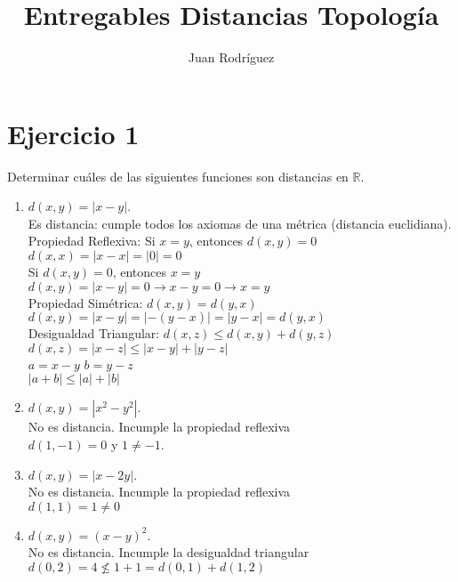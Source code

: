 \documentclass[12pt]{article}
\title{Entregables Distancias Topología}
\author{Juan Rodríguez}
\date{}
\begin{document}
\maketitle

\section*{Ejercicio 1}
Determinar cuáles de las siguientes funciones son distancias en $\mathbb{R}$.

\begin{enumerate}
\item $d(x,y) = |x - y|$. \\
Es distancia: cumple todos los axiomas de una métrica (distancia euclidiana). \\

Propiedad Reflexiva:
Si $x=y$, entonces $d(x,y) = 0$ \\
$d(x,x) = | x - x | = | 0 | = 0$ \\
Si $d(x,y) = 0$, entonces $x=y$ \\
$d(x,y) = |x - y| = 0 \rightarrow x - y = 0 \rightarrow x = y$ \\

Propiedad Simétrica: $d(x,y) = d(y,x)$ \\
$d(x,y) = | x - y | = | - (y - x) | = |y - x| = d(y,x)$ \\

Desigualdad Triangular: $d(x,z) \leq d(x,y) + d(y,z)$ \\
$d(x,z) = | x - z| \leq | x - y| + | y - z|$ \\
$a = x - y$ \quad $b = y - z$ \\
$|a + b| \leq |a| + |b|$

\item $d(x,y) = |x^2 - y^2|$. \\
No es distancia. Incumple la propiedad reflexiva \\
$d(1,-1)=0$ y $1\neq -1$. 

\item $d(x,y) = |x - 2y|$. \\
No es distancia. Incumple la propiedad reflexiva \\
$d(1,1) = 1 \neq 0$

\item $d(x,y) = (x - y)^2$. \\
No es distancia. Incumple la desigualdad triangular \\
$d(0,2) = 4 \not\leq 1 + 1 = d(0,1) + d(1,2)$


\end{enumerate}
\end{document}
